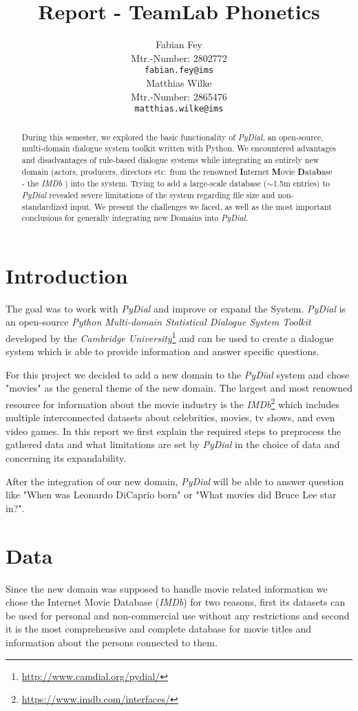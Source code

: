 \documentclass[11pt,a4paper]{article}
\title{Report - TeamLab Phonetics}
\author{Fabian Fey \\
	Mtr.-Number: 2802772 \\
	{\tt fabian.fey@ims} \\\And
	Matthias Wilke \\
	Mtr.-Number: 2865476 \\
	{\tt matthias.wilke@ims} \\}
\date{}
\begin{document}
\maketitle
\begin{abstract}
During this semester, we explored the basic functionality of \textit{PyDial}, an open-source, multi-domain dialogue system toolkit written with Python. We encountered advantages and disadvantages of rule-based dialogue systems while integrating an entirely new domain (actors, producers, directors etc. from the renowned \textbf{I}nternet \textbf{M}ovie \textbf{D}ata\textbf{b}ase - the \emph{IMDb} \citep{IMDb}) into the system. Trying to add a large-scale database ($\sim$1.5m entries) to \textit{PyDial} revealed severe limitations of the system regarding file size and non-standardized input. We present the challenges we faced, as well as the most important conclusions for generally integrating new Domains into \textit{PyDial}. 
\end{abstract}

\section{Introduction}
The goal was to work with \textit{PyDial} \cite{Pydial_2017} and improve or expand the System. \textit{PyDial} is an open-source \textit{Python Multi-domain Statistical Dialogue System Toolkit} developed by the \textit{Cambridge University}\footnote{\url{http://www.camdial.org/pydial/}} and can be used to create a dialogue system which is able to provide information and answer specific questions.

For this project we decided to add a new domain to the \emph{PyDial} system and chose "movies" as the general theme of the new domain. The largest and most renowned resource for information about the movie industry is the \emph{IMDb}\footnote{\url{https://www.imdb.com/interfaces/}} which includes multiple interconnected datasets about celebrities, movies, tv shows, and even video games. In this report we first explain the required steps to preprocess the gathered data and what limitations are set by \emph{PyDial} in the choice of data and concerning its expandability.

After the integration of our new domain, \emph{PyDial} will be able to answer question like "When was Leonardo DiCaprio born" or "What movies did Bruce Lee star in?".
	
\section{Data}
Since the new domain was supposed to handle movie related information we chose the Internet Movie Database (\emph{IMDb}) for two reasons, first its datasets can be used for personal and non-commercial use without any restrictions and second it is the most comprehensive and complete database for movie titles and information about the persons connected to them.
\end{document}
